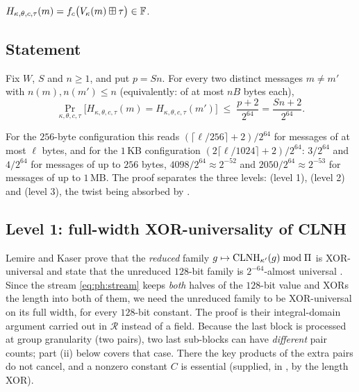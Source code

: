 \begin{definition}\label{def:ph:hash}
$H_{\kappa,\theta,c,\tau}(m)=f_c\bigl(V_\kappa(m)\boxplus\tau\bigr)\in\mathbb{F}$.
\end{definition}

\subsection{Statement}

\begin{theorem}\label{thm:ph:collision}
Fix $W$, $S$ and $n\ge1$, and put $p=Sn$.  For every two distinct messages
$m\ne m'$ with $n(m),n(m')\le n$ (equivalently: of at most $nB$ bytes each),
\[
  \Pr_{\kappa,\theta,c,\tau}\bigl[H_{\kappa,\theta,c,\tau}(m)=H_{\kappa,\theta,c,\tau}(m')\bigr]\;\le\;\frac{p+2}{2^{64}}=\frac{Sn+2}{2^{64}} .
\]
\end{theorem}

For the $256$-byte configuration this reads $(\lceil\ell/256\rceil+2)/2^{64}$
for messages of at most $\ell$ bytes, and for the $1$\,KB configuration
$(2\lceil\ell/1024\rceil+2)/2^{64}$: $3/2^{64}$ and $4/2^{64}$ for messages of
up to $256$ bytes, $4098/2^{64}\approx2^{-52}$ and $2050/2^{64}\approx2^{-53}$
for messages of up to $1$\,MB.  The proof separates the three levels:
 (level 1),  (level 2) and
 (level 3), the twist being absorbed by
.

\subsection{Level 1: full-width XOR-universality of CLNH}

Lemire and Kaser prove that the \emph{reduced} family $g\mapsto\mathrm{CLNH}_{\kappa'}(g)\bmod\Pi$
is XOR-universal and state that the unreduced $128$-bit family is
$2^{-64}$-almost universal \cite[\S5 and Lemma~5]{lemire2015clhash}.  Since
the stream \eqref{eq:ph:stream} keeps \emph{both} halves of the $128$-bit
value and XORs the length into both of them, we need the unreduced family to
be XOR-universal on its full width, for every $128$-bit constant.  The proof
is their integral-domain argument carried out in $\mathcal R$ instead of a field.
Because the last block is processed at group granularity (two pairs), two
last sub-blocks can
have \emph{different} pair counts; part (ii) below covers that case.  There
the key products of the extra pairs do not cancel, and a nonzero constant
$C$ is essential (supplied, in , by the length XOR).

